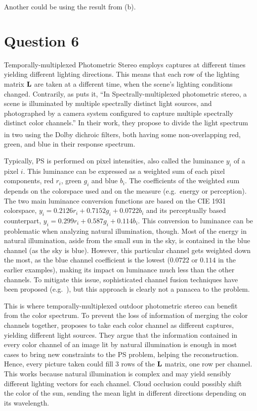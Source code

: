 \documentclass{report}
\begin{document}
Another could be using the result from (b).

\section{Question 6}

Temporally-multiplexed Photometric Stereo employs captures at different times yielding different lighting directions. This means that each row of the lighting matrix $\mathbf{L}$ are taken at a different time, when the scene's lighting conditions changed. Contrarily, as \cite{Fyffe2011} puts it, ``In Spectrally-multiplexed photometric stereo, a scene is illuminated by multiple spectrally distinct light sources, and photographed by a camera system configured to capture multiple spectrally distinct color channels.'' In their work, they propose to divide the light spectrum in two using the Dolby\textsuperscript{\textregistered} dichroic filters, both having some non-overlapping red, green, and blue in their response spectrum.

Typically, PS is performed on pixel intensities, also called the luminance $y_i$ of a pixel $i$. This luminance can be expressed as a weighted sum of each pixel components, red $r_i$, green $g_i$ and blue $b_i$. The coefficients of the weighted sum depends on the colorspace used and on the measure (e.g.\ energy or perception). The two main luminance conversion functions are based on the CIE 1931 colorspace, $y_i = 0.2126r_i + 0.7152g_i + 0.0722b_i$ and its perceptually based counterpart, $y_i = 0.299r_i + 0.587g_i + 0.114b_i$. This conversion to luminance can be problematic when analyzing natural illumination, though. Most of the energy in natural illumination, aside from the small sun in the sky, is contained in the blue channel (as the sky is blue). However, this particular channel gets weighted down the most, as the blue channel coefficient is the lowest ($0.0722$ or $0.114$ in the earlier examples), making its impact on luminance much less than the other channels. To mitigate this issue, sophisticated channel fusion techniques have been proposed (e.g.\ \cite{jung-cvpr-15}), but this approach is clearly not a panacea to the problem.

This is where temporally-multiplexed outdoor photometric stereo can benefit from the color spectrum. To prevent the loss of information of merging the color channels together, \cite{johnson-cvpr-11} proposes to take each color channel as different captures, yielding different light sources. They argue that the information contained in every color channel of an image lit by natural illumination is enough in most cases to bring new constraints to the PS problem, helping the reconstruction. Hence, every picture taken could fill 3 rows of the $\mathbf{L}$ matrix, one row per channel. This works because natural illumination is complex and may yield sensibly different lighting vectors for each channel. Cloud occlusion could possibly shift the color of the sun, sending the mean light in different directions depending on its wavelength.
\end{document}

